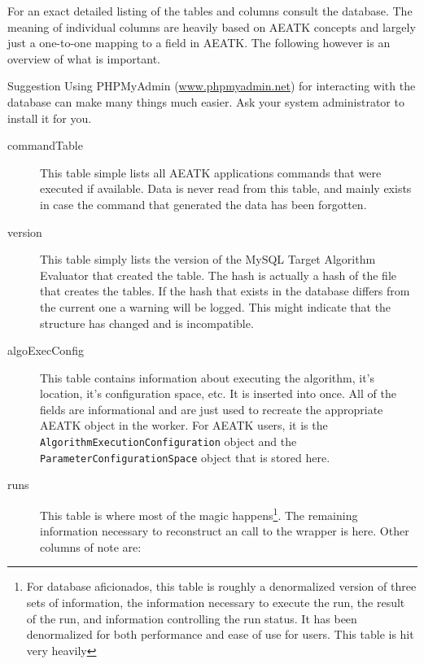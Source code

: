 \documentclass[11pt,letterpaper,oneside]{article}
\begin{document}
For an exact detailed listing of the tables and columns consult the database. The meaning of individual columns are heavily  based on AEATK concepts and largely just a one-to-one mapping to a field in AEATK.  The following however is an overview of what is important.

\begin{bclogo}[logo=\bclampe, couleurBarre=red, noborder=true]{Suggestion}
Using PHPMyAdmin (\url{www.phpmyadmin.net}) for interacting with the database can make many things much easier. Ask your system administrator to install it for you.

\end{bclogo}

\begin{description}

\item[commandTable]	 This table simple lists all AEATK applications commands that were executed if available. Data is never read from this table, and mainly exists in case the command that generated the data has been forgotten.

\item[version] This table simply lists the version of the MySQL Target Algorithm Evaluator that created the table. The hash is actually a hash of the file that creates the tables. If the hash that exists in the database differs from the current one a warning will be logged. This might indicate that the structure has changed and is incompatible.

\item[algoExecConfig] This table contains information about executing the algorithm, it's location, it's configuration space, etc. It is inserted into once. All of the fields are informational and are just used to recreate the appropriate AEATK object in the worker. For AEATK users, it is the \texttt{AlgorithmExecutionConfiguration} object and the \texttt{ParameterConfigurationSpace} object that is stored here.

\item[runs] This table is where most of the magic happens\footnote{For database aficionados, this table is roughly a denormalized version of three sets of information, the information necessary to execute the run, the result of the run, and information controlling the run status. It has been denormalized for both performance and ease of use for users. This table is hit very heavily}. The remaining information necessary to reconstruct an call to the wrapper is here.  Other columns of note are:


\end{description}
\end{document}
